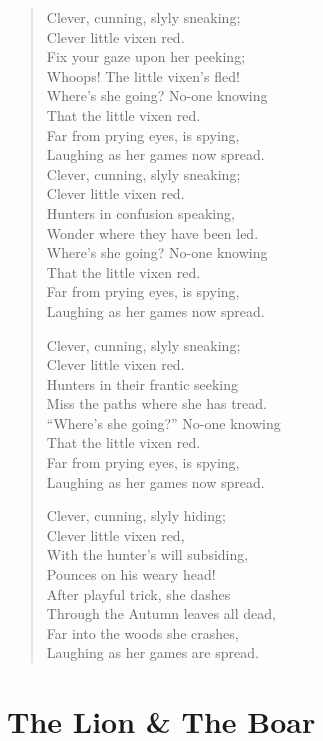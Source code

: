 \begin{verse}
Clever, cunning, slyly sneaking; \\
Clever little vixen red. \\
Fix your gaze upon her peeking; \\
Whoops! The little vixen’s fled! \\
Where’s she going? No-one knowing \\
That the little vixen red. \\
Far from prying eyes, is spying, \\
Laughing as her games now spread. \\
Clever, cunning, slyly sneaking; \\
Clever little vixen red. \\
Hunters in confusion speaking, \\
Wonder where they have been led. \\
Where’s she going? No-one knowing \\
That the little vixen red. \\
Far from prying eyes, is spying, \\
Laughing as her games now spread.

Clever, cunning, slyly sneaking; \\
Clever little vixen red. \\
Hunters in their frantic seeking \\
Miss the paths where she has tread. \\
``Where’s she going?'' No-one knowing \\
That the little vixen red. \\
Far from prying eyes, is spying, \\
Laughing as her games now spread.

Clever, cunning, slyly hiding; \\
Clever little vixen red, \\
With the hunter’s will subsiding, \\
Pounces on his weary head! \\
After playful trick, she dashes \\
Through the Autumn leaves all dead, \\
Far into the woods she crashes, \\
Laughing as her games are spread.
\end{verse}

\newpage
\section*{The Lion \& The Boar}

